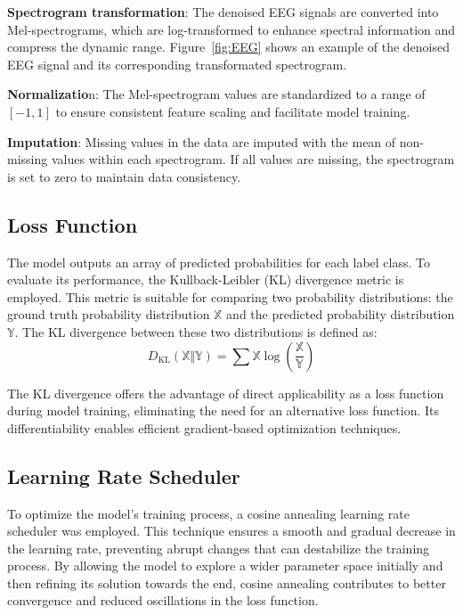 \documentclass[conference]{IEEEtran}
\newcommand{\XX}{{\mathbb{X}}}
\newcommand{\YY}{{\mathbb{Y}}}
\let\proglang=\textsf
\let\pkg=\texttt
\begin{document}
\textbf{Spectrogram transformation}: The denoised EEG signals are converted
into Mel-spectrograms, which are log-transformed to enhance spectral
information and compress the dynamic range. Figure~\ref{fig:EEG} shows an
example of the denoised EEG signal and its corresponding transformated
spectrogram.


\textbf{Normalizatio}n: The Mel-spectrogram values are standardized to a range
of $[-1,1]$ to ensure consistent feature scaling and facilitate model training.


\textbf{Imputation}: Missing values in the data are imputed with the mean of
non-missing values within each spectrogram. If all values are missing,
the spectrogram is set to zero to maintain data consistency.


\subsection{Loss Function}


The model outputs an array of predicted probabilities for each label class.
To evaluate its performance, the Kullback-Leibler (KL) divergence metric is
employed. This metric is suitable for comparing two probability distributions: 
the ground truth probability distribution $\XX$ and the predicted probability
distribution $\YY$. The KL divergence between these two distributions is
defined as:
\begin{equation*}
D_\mathrm{KL}(\XX \Vert \YY) = \sum \XX \log\left(\frac{\XX}{\YY}\right)
\end{equation*}


The KL divergence offers the advantage of direct applicability as a loss
function during model training, eliminating the need for an alternative loss
function. Its differentiability enables efficient gradient-based optimization
techniques.


\subsection{Learning Rate Scheduler}


To optimize the model's training process, a cosine annealing learning rate
scheduler was employed. This technique ensures a smooth and gradual decrease in
the learning rate, preventing abrupt changes that can destabilize the training
process. By allowing the model to explore a wider parameter space initially and
then refining its solution towards the end, cosine annealing contributes to
better convergence and reduced oscillations in the loss function.
\end{document}
